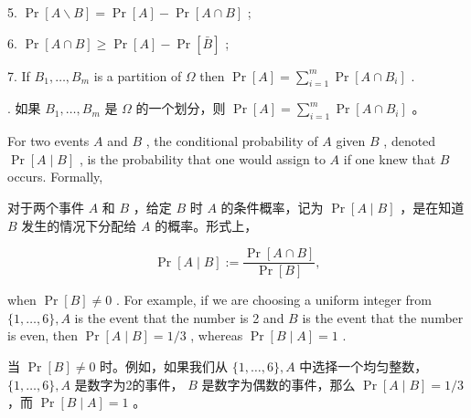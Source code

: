 \documentclass[10pt]{article}
\begin{document}
5. \(\Pr \left\lbrack  {A \smallsetminus  B}\right\rbrack   = \Pr \left\lbrack  A\right\rbrack   - \Pr \left\lbrack  {A \cap  B}\right\rbrack\) ;

6. \(\Pr \left\lbrack  {A \cap  B}\right\rbrack   \geq  \Pr \left\lbrack  A\right\rbrack   - \Pr \left\lbrack  \bar{B}\right\rbrack\) ;

7. If \({B}_{1},\ldots ,{B}_{m}\) is a partition of \(\Omega\) then \(\Pr \left\lbrack  A\right\rbrack   = \mathop{\sum }\limits_{{i = 1}}^{m}\Pr \left\lbrack  {A \cap  {B}_{i}}\right\rbrack\) .

\begin{tcolorbox}. 如果 \({B}_{1},\ldots ,{B}_{m}\) 是 \(\Omega\) 的一个划分，则 \(\Pr \left\lbrack  A\right\rbrack   = \mathop{\sum }\limits_{{i = 1}}^{m}\Pr \left\lbrack  {A \cap  {B}_{i}}\right\rbrack\) 。
\end{tcolorbox}

For two events \(A\) and \(B\) , the conditional probability of \(A\) given \(B\) , denoted \(\Pr \left\lbrack  {A \mid  B}\right\rbrack\) , is the probability that one would assign to \(A\) if one knew that \(B\) occurs. Formally,

\begin{tcolorbox}\relax
对于两个事件 \(A\) 和 \(B\) ，给定 \(B\) 时 \(A\) 的条件概率，记为 \(\Pr \left\lbrack  {A \mid  B}\right\rbrack\) ，是在知道 \(B\) 发生的情况下分配给 \(A\) 的概率。形式上，
\end{tcolorbox}

\[
\Pr \left\lbrack  {A \mid  B}\right\rbrack   \mathrel{\text{ := }} \frac{\Pr \left\lbrack  {A \cap  B}\right\rbrack  }{\Pr \left\lbrack  B\right\rbrack  },
\]

when \(\Pr \left\lbrack  B\right\rbrack   \neq  0\) . For example, if we are choosing a uniform integer from \(\{ 1,\ldots ,6\} ,A\) is the event that the number is 2 and \(B\) is the event that the number is even, then \(\Pr \left\lbrack  {A \mid  B}\right\rbrack   = 1/3\) , whereas \(\Pr \left\lbrack  {B \mid  A}\right\rbrack   = 1\) .

\begin{tcolorbox}\relax
当 \(\Pr \left\lbrack  B\right\rbrack   \neq  0\) 时。例如，如果我们从 \(\{ 1,\ldots ,6\} ,A\) 中选择一个均匀整数， \(\{ 1,\ldots ,6\} ,A\) 是数字为2的事件， \(B\) 是数字为偶数的事件，那么 \(\Pr \left\lbrack  {A \mid  B}\right\rbrack   = 1/3\) ，而 \(\Pr \left\lbrack  {B \mid  A}\right\rbrack   = 1\) 。
\end{tcolorbox}
\end{document}
